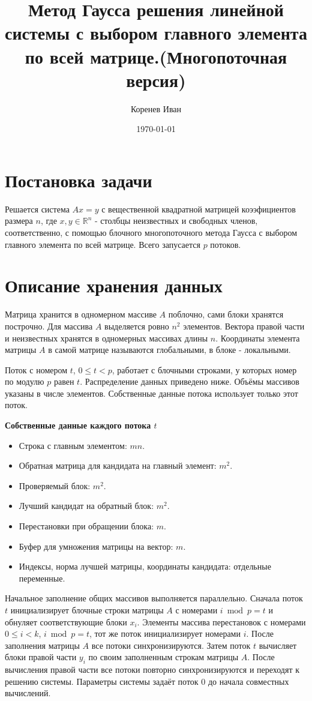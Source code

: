 \documentclass[a4paper,12pt]{article}
\begin{document}
\author{Коренев Иван}
\title{Метод Гаусса решения линейной системы с выбором главного элемента по всей матрице.(Многопоточная версия)}
\date{\today}
\maketitle

\section{Постановка задачи}
Решается система $Ax = y$ с вещественной квадратной матрицей коээфициентов размера $n$, где $x, y \in \mathbb{R}^n$ - столбцы неизвестных и свободных членов, соответственно, с помощью блочного многопоточного метода Гаусса с выбором главного элемента по всей матрице. Всего запусается $p$ потоков.

\section{Описание хранения данных}
Матрица хранится в одномерном массиве $A$ поблочно, сами блоки хранятся построчно. Для массива $A$ выделяется ровно $n^2$ элементов. Вектора правой части и неизвестных хранятся в одномерных массивах длины $n$. Координаты элемента матрицы $A$ в самой матрице называются глобальными, в блоке - локальными.

Поток с номером $t$, $0 \leq t < p$, работает с блочными строками, у которых номер по модулю $p$ равен $t$. Распределение данных приведено ниже. Объёмы массивов указаны в числе элементов. Собственные данные потока использует только этот поток. 

\textbf{Собственные данные каждого потока $t$}
\begin{itemize}
    \item Строка с главным элементом: $mn$.
    \item Обратная матрица для кандидата на главный элемент: $m^2$.
    \item Проверяемый блок: $m^2$.
    \item Лучший кандидат на обратный блок: $m^2$.
    \item Перестановки при обращении блока: $m$.
    \item Буфер для умножения матрицы на вектор: $m$.
    \item Индексы, норма лучшей матрицы, координаты кандидата: отдельные переменные.
\end{itemize}

Начальное заполнение общих массивов выполняется параллельно. Сначала поток $t$ инициализирует блочные строки матрицы $A$ с номерами $i \bmod p = t$ и обнуляет соответствующие блоки $x_i$. Элементы массива перестановок с номерами $0 \leq i < k$, $i \bmod p = t$, тот же поток инициализирует номерами $i$. После заполнения матрицы $A$ все потоки синхронизируются. Затем поток $t$ вычисляет блоки правой части $y_i$ по своим заполненным строкам матрицы $A$. После вычисления правой части все потоки повторно синхронизируются и переходят к решению системы. Параметры системы задаёт поток $0$ до начала совместных вычислений.
\end{document}

